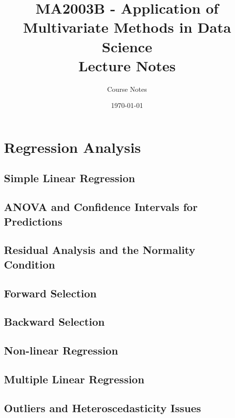 \documentclass[12pt]{book}
\title{MA2003B - Application of Multivariate Methods in Data Science\\Lecture Notes}
\author{Course Notes}
\date{\today}
\theoremstyle{definition}
\theoremstyle{remark}
\begin{document}
\frontmatter
\maketitle

\tableofcontents

\mainmatter

\chapter{Regression Analysis}

\section{Simple Linear Regression}

\section{ANOVA and Confidence Intervals for Predictions}

\section{Residual Analysis and the Normality Condition}

\section{Forward Selection}

\section{Backward Selection}

\section{Non-linear Regression}

\section{Multiple Linear Regression}

\section{Outliers and Heteroscedasticity Issues}
\end{document}

